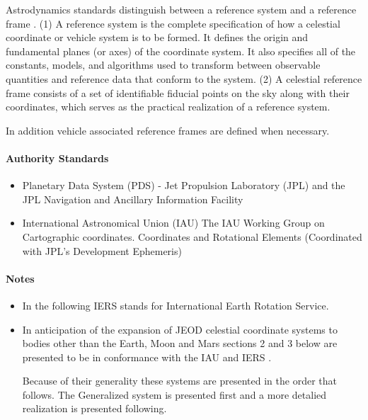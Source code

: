 \documentclass[twoside,11pt,titlepage]{report}
\begin{document}
Astrodynamics standards distinguish between a reference system and a reference frame \cite{IAU2006}.
(1) A reference system is the complete specification of how a celestial coordinate
or vehicle system is to be formed. It defines the origin and fundamental planes (or axes) of the coordinate system. It also specifies all of the constants, models, and algorithms used to transform between observable quantities and reference data that conform to the system.
(2) A celestial reference frame consists of a set of identifiable fiducial points on the sky along with their coordinates, which serves as the practical realization of a reference system.

In addition vehicle associated reference frames are defined when necessary.

\paragraph{Authority Standards} 
\begin{itemize}
\item {Planetary Data System (PDS) - Jet Propulsion Laboratory (JPL) and the 
JPL Navigation and Ancillary Information Facility }
\item { International Astronomical Union (IAU)
The IAU Working Group on Cartographic coordinates.
     Coordinates and Rotational Elements
(Coordinated with JPL's Development Ephemeris) }
\end{itemize}

\paragraph{Notes}
\begin{itemize}
\item {In the following IERS stands for International Earth Rotation Service.}
\item{ In anticipation of the expansion of JEOD celestial coordinate systems to bodies other than the Earth, Moon and Mars sections 2 and 3 below 
are presented to be in conformance with
the IAU\cite{IAU2006} and IERS \cite{IERS2003}.

Because of their generality these systems are presented in the order that follows. The Generalized system is presented first and a more detalied realization is presented following.}
\end{itemize}



\end{document}
